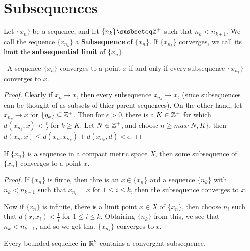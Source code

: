 \section{Subsequences}\label{section_3.2}

\begin{definition}
  Let $\{x_n\}$ be a sequence, and let  $\{n_k\} \susbseteq \Z^+$ such that
  $n_k<n_{k+1}$. We call the sequence $\{x_{n_k}\}$ a \textbf{Subsequence} of $\{x_n\}$. If
  $\{x_{n_k}\}$ converges, we call its limit the \textbf{subsequential limit} of $\{x_n\}$.
\end{definition}

\begin{theorem}\label{3.2.1}\
  A sequence $\{x_n\}$ converges to a point  $x$ if  and only if every subsequence
  $\{x_{n_k}\}$ converges to $x$.
\end{theorem}
\begin{proof}
  Clearly if $x_n \rightarrow x$, then every subsequence  $x_{n_k} \rightarrow x$, (since subsequences
  can be thought of as subsets of thier parent sequences). On the other hand, let
  $x_{n_k} \rightarrow x$ for $\{\eta_k\} \subseteq \mathbb{Z}^+$. Then for  $\epsilon>0$, there is a
  $K \in \mathbb{Z}^+$ for which  $d(x_{n_k},x)<\frac{\epsilon}{2}$ for $k \geq K$. Let $N \in \mathbb{Z}^+$, and
  choose  $n \geq max\{N,K\}$, then  $d(x_n,x) \leq d(x_n,x_{n_k})+d(x_{n_k},d)<\epsilon$.
\end{proof}

\begin{theorem}\label{3.2.2}
  If $\{x_n\}$ is a sequence in a compact metric space  $X$, then some subsequence of
  $\{x_n\}$ converges to a point  $x$.
\end{theorem}
\begin{proof}
  If $\{x_n\}$ is finite, then thre is an  $x \in \{x_n\}$ and a sequence  $\{n_k\}$ with
  $n_k<n_{k+1}$ such that  $x_{n_i}=x$ for  $1 \leq i \leq k$, then the subsequence converges
  to  $x$.

  Now if  $\{x_n\}$ is infinite, there is a limit point  $x \in X$ of $\{x_n\}$, then
  choose  $n_i$ such that  $d(x,x_i)<\frac{1}{i}$ for $1 \leq i \leq k$. Obtaining  $\{n_k\}$
  from this, we see that  $n_k<n_{k+1}$, and so we get that  $\{x_{n_k}\}$ converges to  $x$.
\end{proof}
\begin{corollary}
  Every bounded sequence in $\mathbb{R}^k$ contains a convergent subsequence.
\end{corollary}

